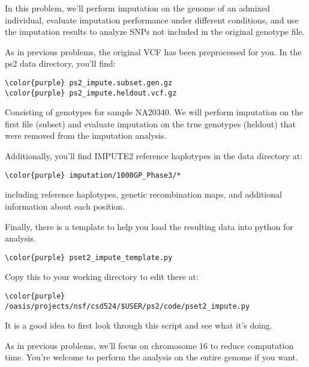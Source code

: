 \documentclass[12pt]{article}
\begin{document}
In this problem, we'll perform imputation on the genome of an admixed individual, evaluate imputation performance under different conditions, and use the imputation results to analyze SNPs not included in the original genotype file.

As in previous problems, the original VCF has been preprocessed for you. In the ps2 data directory, you'll find:

\begin{Verbatim}[commandchars=\\\{\}]
\color{purple} ps2_impute.subset.gen.gz 
\color{purple} ps2_impute.heldout.vcf.gz 
\end{Verbatim}

Consisting of genotypes for sample NA20340. We will perform imputation on the first file (subset) and evaluate imputation on the true genotypes (heldout) that were removed from the imputation analysis.

Additionally, you'll find IMPUTE2 reference haplotypes in the data directory at:
\begin{Verbatim}[commandchars=\\\{\}]
\color{purple} imputation/1000GP_Phase3/*
\end{Verbatim}
including reference haplotypes, genetic recombination maps, and additional information about each position.

Finally, there is a template to help you load the resulting data into python for analysis.
\begin{Verbatim}[commandchars=\\\{\}]
\color{purple} pset2_impute_template.py
\end{Verbatim}
Copy this to your working directory to edit there at:
\begin{Verbatim}[commandchars=\\\{\}]
\color{purple} /oasis/projects/nsf/csd524/$USER/ps2/code/pset2_impute.py
\end{Verbatim}
It is a good idea to first look through this script and see what it's doing.

As in previous problems, we'll focus on chromosome 16 to reduce computation time. You're welcome to perform the analysis on the entire genome if you want.
\end{document}
